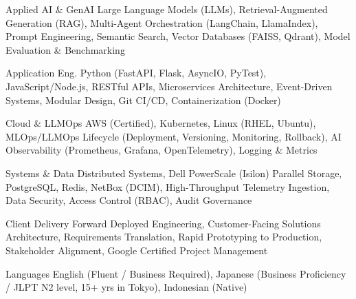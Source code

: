 

\begin{cvskills}

  \cvskill
    {Applied AI \& GenAI} %
    {Large Language Models (LLMs), Retrieval-Augmented Generation (RAG), Multi-Agent Orchestration (LangChain, LlamaIndex), Prompt Engineering, Semantic Search, Vector Databases (FAISS, Qdrant), Model Evaluation \& Benchmarking} %

  \cvskill
    {Application Eng.} %
    {Python (FastAPI, Flask, AsyncIO, PyTest), JavaScript/Node.js, RESTful APIs, Microservices Architecture, Event-Driven Systems, Modular Design, Git CI/CD, Containerization (Docker)} %

  \cvskill
    {Cloud \& LLMOps} %
    {AWS (Certified), Kubernetes, Linux (RHEL, Ubuntu), MLOps/LLMOps Lifecycle (Deployment, Versioning, Monitoring, Rollback), AI Observability (Prometheus, Grafana, OpenTelemetry), Logging \& Metrics} %

  \cvskill
    {Systems \& Data} %
    {Distributed Systems, Dell PowerScale (Isilon) Parallel Storage, PostgreSQL, Redis, NetBox (DCIM), High-Throughput Telemetry Ingestion, Data Security, Access Control (RBAC), Audit Governance} %

  \cvskill
    {Client Delivery} %
    {Forward Deployed Engineering, Customer-Facing Solutions Architecture, Requirements Translation, Rapid Prototyping to Production, Stakeholder Alignment, Google Certified Project Management} %

  \cvskill
    {Languages} %
    {English (Fluent / Business Required), Japanese (Business Proficiency / JLPT N2 level, 15+ yrs in Tokyo), Indonesian (Native)} %

\end{cvskills}
